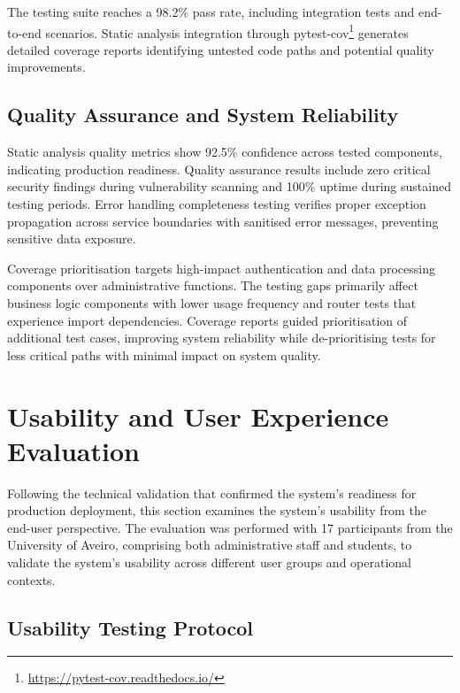 The testing suite reaches a 98.2\% pass rate, including integration tests and end-to-end scenarios. Static analysis integration through pytest-cov\footnote{\url{https://pytest-cov.readthedocs.io/}} generates detailed coverage reports identifying untested code paths and potential quality improvements.

\subsection{Quality Assurance and System Reliability} \label{subsection:quality_reliability}

Static analysis quality metrics show 92.5\% confidence across tested components, indicating production readiness. Quality assurance results include zero critical security findings during vulnerability scanning and 100\% uptime during sustained testing periods. Error handling completeness testing verifies proper exception propagation across service boundaries with sanitised error messages, preventing sensitive data exposure.

Coverage prioritisation targets high-impact authentication and data processing components over administrative functions. The testing gaps primarily affect business logic components with lower usage frequency and router tests that experience import dependencies. Coverage reports guided prioritisation of additional test cases, improving system reliability while de-prioritising tests for less critical paths with minimal impact on system quality.


\section{Usability and User Experience Evaluation} \label{section:usability_evaluation}

Following the technical validation that confirmed the system's readiness for production deployment, this section examines the system's usability from the end-user perspective. The evaluation was performed with 17 participants from the University of Aveiro, comprising both administrative staff and students, to validate the system's usability across different user groups and operational contexts.

\subsection{Usability Testing Protocol} \label{subsection:usability_protocol}

